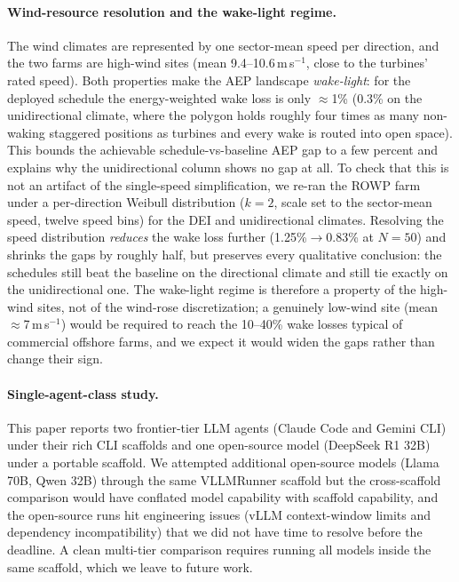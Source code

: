 \paragraph{Wind-resource resolution and the wake-light regime.}
The wind climates are represented by one sector-mean speed per
direction, and the two farms are high-wind sites (mean 9.4--10.6\,m\,s$^{-1}$,
close to the turbines' rated speed). Both properties make the AEP
landscape \emph{wake-light}: for the deployed schedule the
energy-weighted wake loss is only $\approx$1\% (0.3\% on the
unidirectional climate, where the polygon holds roughly four times as
many non-waking staggered positions as turbines and every wake is
routed into open space). This bounds the achievable
schedule-vs-baseline AEP gap to a few percent and explains why the
unidirectional column shows no gap at all. To check that this is not
an artifact of the single-speed simplification, we re-ran the ROWP
farm under a per-direction Weibull distribution ($k{=}2$, scale set to
the sector-mean speed, twelve speed bins) for the DEI and unidirectional
climates. Resolving the speed distribution \emph{reduces} the wake loss
further (1.25\%$\rightarrow$0.83\% at $N{=}50$) and shrinks the gaps by
roughly half, but preserves every qualitative conclusion: the schedules
still beat the baseline on the directional climate and still tie exactly
on the unidirectional one. The wake-light regime is therefore a property
of the high-wind sites, not of the wind-rose discretization; a
genuinely low-wind site (mean $\approx$7\,m\,s$^{-1}$) would be required
to reach the 10--40\% wake losses typical of commercial offshore farms,
and we expect it would widen the gaps rather than change their sign.

\paragraph{Single-agent-class study.}
This paper reports two frontier-tier LLM agents (Claude Code
and Gemini CLI) under their rich CLI scaffolds and one
open-source model (DeepSeek R1 32B) under a portable scaffold. We
attempted additional open-source models (Llama 70B, Qwen 32B)
through the same VLLMRunner scaffold but the
cross-scaffold comparison would have conflated model capability
with scaffold capability, and the open-source runs hit engineering
issues (vLLM context-window limits and dependency incompatibility)
that we did not have time to resolve before the deadline. A
clean multi-tier comparison requires running all models inside the
same scaffold, which we leave to future work.
